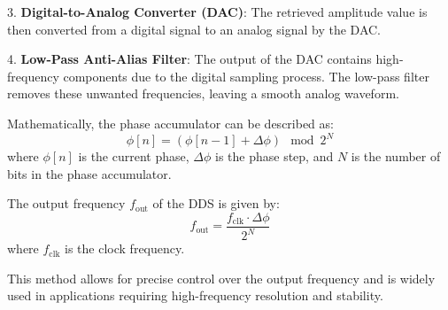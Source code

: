 3. \textbf{Digital-to-Analog Converter (DAC)}: The retrieved amplitude value is then converted from a digital signal to an analog signal by the DAC.

4. \textbf{Low-Pass Anti-Alias Filter}: The output of the DAC contains high-frequency components due to the digital sampling process. The low-pass filter removes these unwanted frequencies, leaving a smooth analog waveform.

Mathematically, the phase accumulator can be described as:
\[
\phi[n] = (\phi[n-1] + \Delta\phi) \mod 2^N
\]
where \(\phi[n]\) is the current phase, \(\Delta\phi\) is the phase step, and \(N\) is the number of bits in the phase accumulator.

The output frequency \(f_{\text{out}}\) of the DDS is given by:
\[
f_{\text{out}} = \frac{f_{\text{clk}} \cdot \Delta\phi}{2^N}
\]
where \(f_{\text{clk}}\) is the clock frequency.

This method allows for precise control over the output frequency and is widely used in applications requiring high-frequency resolution and stability.

